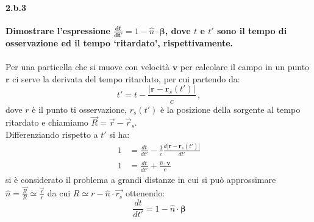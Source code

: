 \documentclass[twoside]{article}
\begin{document}
\paragraph{2.b.3}\textbf{Dimostrare l’espressione $\mathbf{\frac{\text{d}t}{\text{d}t'}}=1-\hat{n}\cdot\bm{\beta}$, dove $t$ e $t'$ sono il tempo di osservazione ed il tempo ‘ritardato’, rispettivamente.}\\ \\
Per una particella che si muove con velocità $\mathbf{v}$ per calcolare il campo in un punto $\mathbf{r}$ ci serve la derivata del tempo ritardato, per cui partendo da:
\begin{equation}
    t'=t-\frac{|\mathbf{r}-\mathbf{r}_s(t')|}{c}\, ,
\end{equation}
dove $r$ è il punto ti osservazione, $r_s(t')$ è la posizione della sorgente al tempo ritardato e chiamiamo $\vec{R}=\vec{r}-\vec{r}_s $.\\
Differenziando rispetto a $t'$ si ha:
\begin{align*}
    1&=\frac{d t}{d t'}-\frac{1}{c}\frac{d|\mathbf{r}-\mathbf{r}_s(t')|}{dt'}\\
    1&=\frac{d t}{d t'}+\frac{\hat{n}\cdot\mathbf{v}}{c}
\end{align*}
si è considerato il problema a grandi distanze in cui si può approssimare $\hat{n}= \frac{\vec{R}}{R}\simeq \frac{\vec{r}}{r}$ da cui $R\simeq r-\hat{n}\cdot \vec{r_s}$ ottenendo: 
\begin{equation*}
    \frac{dt}{dt'}=1-\hat{n}\cdot\bm{\beta}
\end{equation*}
\end{document}
